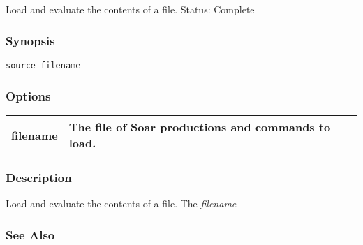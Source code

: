 \subsection{}
\label{source}
Load and evaluate the contents of a file. 
 Status: Complete
\subsubsection*{Synopsis}
\begin{verbatim}
source filename
\end{verbatim}
\subsubsection*{Options}
\begin{tabular}{|l|l|}
\hline 
filename & The file of Soar productions and commands to load.  \\
 \hline 
\end{tabular}
\subsubsection*{Description}
 Load and evaluate the contents of a file. The \emph{filename}
\subsubsection*{See Also}
